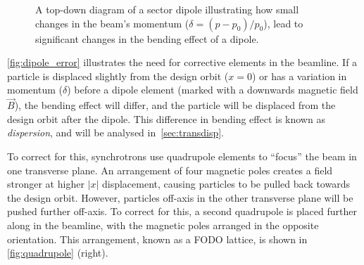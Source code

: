 \documentclass[11pt]{report}
\begin{document}
\begin{figure}[h]
\begin{tikzpicture}[x=0.75pt,y=0.75pt,yscale=-1,xscale=1]
\end{tikzpicture}
\caption{A top-down diagram of a sector dipole illustrating how small changes in the beam's momentum ($\delta = (p-p_0)/p_0$), lead to significant changes in the bending effect of a dipole.}
\label{fig:dipole_error}
\end{figure}

\autoref{fig:dipole_error} illustrates the need for corrective elements in the beamline. If a particle is displaced slightly from the design orbit ($x=0$) or has a variation in momentum ($\delta$) before a dipole element (marked with a downwards magnetic field $\vec B$), the bending effect will differ, and the particle will be displaced from the design orbit after the dipole. This difference in bending effect is known as \textit{dispersion}, and will be analysed in~\autoref{sec:transdisp}.

To correct for this, synchrotrons use quadrupole elements to ``focus'' the beam in one transverse plane. An arrangement of four magnetic poles creates a field stronger at higher $|x|$ displacement, causing particles to be pulled back towards the design orbit. However, particles off-axis in the other transverse plane will be pushed further off-axis. To correct for this, a second quadrupole is placed further along in the beamline, with the magnetic poles arranged in the opposite orientation. This arrangement, known as a FODO lattice, is shown in \autoref{fig:quadrupole} (right).
\end{document}
